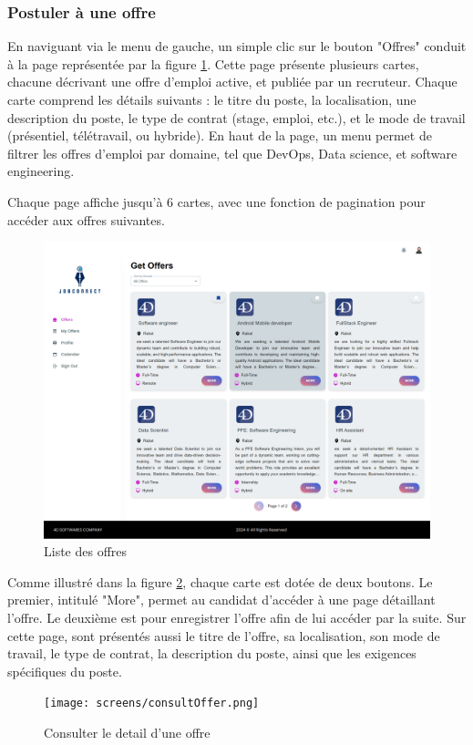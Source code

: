 \vspace{6cm}

\subsubsection{Postuler à une offre}
En naviguant via le menu de gauche, un simple clic sur le 
bouton "Offres" conduit à la page représentée par la figure \ref{fig:listOffers}.  
Cette  page  présente plusieurs cartes, chacune décrivant une  
offre d'emploi active, et  publiée par un 
recruteur. Chaque carte comprend les détails suivants : 
le titre du poste, la localisation, une description 
du poste, le  type de  contrat (stage, emploi, etc.), et 
le mode de travail (présentiel, télétravail, ou hybride). En haut 
de la page, un menu permet de filtrer les offres d'emploi par 
domaine, tel que DevOps, Data science, et software engineering.
\newline

Chaque page affiche jusqu'à 6 cartes,  avec  une  fonction  de  pagination pour accéder aux offres suivantes.
\begin{figure}[htbp]
   \centering
   \includegraphics[scale=0.2]{screens/cartes.png} 
   \caption{Liste des offres}
   \label{fig:listOffers}
\end{figure}

Comme illustré dans la figure \ref{fig:detailsOffre}, chaque 
carte est dotée de deux boutons. Le premier, intitulé "More", 
permet au candidat d'accéder à une page détaillant l'offre. 
Le deuxième est pour enregistrer l'offre afin de lui accéder par la suite.
Sur cette page, sont présentés aussi le  titre  de  l'offre,  
sa  localisation,  son mode de travail, le type de contrat, 
la description du  poste,  ainsi  que  les exigences 
spécifiques du poste.
\newline
\begin{figure}[htb]
   \centering
   \texttt{[image: screens/consultOffer.png]} 
   \caption{Consulter le detail d'une offre}
   \label{fig:detailsOffre}
\end{figure}
\vspace{3cm}

